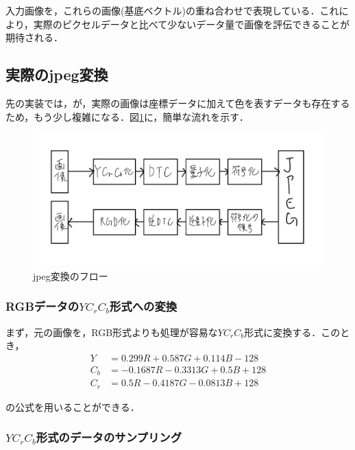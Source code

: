 \documentclass[uplatex,dvipdfmx,ja=standard]{bxjsarticle}
\begin{document}
入力画像を，これらの画像(基底ベクトル)の重ね合わせで表現している．これにより，実際のピクセルデータと比べて少ないデータ量で画像を評伝できることが期待される．

\newpage

\subsection{実際のjpeg変換}

先の実装では，が，実際の画像は座標データに加えて色を表すデータも存在するため，もう少し複雑になる．図\ref{figure:jpg}に，簡単な流れを示す．

\begin{figure}[htb]
    \centering
    \includegraphics[scale=0.23]{img/jpeg.jpg}
    \caption{jpeg変換のフロー}
    \label{figure:jpg}
\end{figure}

\subsubsection{RGBデータの$YC_r C_b$形式への変換}

まず，元の画像を，RGB形式よりも処理が容易な$YC_rC_b$形式に変換する．このとき，
\begin{equation}
    \begin{split}
        Y &= 0.299R + 0.587G + 0.114B -128 \\
        C_b &= -0.1687R - 0.3313G + 0.5B + 128 \\
        C_r &= 0.5R - 0.4187G - 0.0813B + 128
    \end{split}
\end{equation}

の公式を用いることができる．

\subsubsection{$YC_rC_b$形式のデータのサンプリング}
\end{document}
